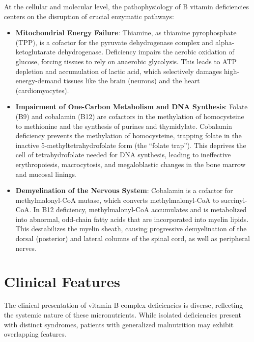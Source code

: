 At the cellular and molecular level, the pathophysiology of B vitamin deficiencies centers on the disruption of crucial enzymatic pathways:
\begin{itemize}
    \item \textbf{Mitochondrial Energy Failure}: Thiamine, as thiamine pyrophosphate (TPP), is a cofactor for the pyruvate dehydrogenase complex and alpha-ketoglutarate dehydrogenase. Deficiency impairs the aerobic oxidation of glucose, forcing tissues to rely on anaerobic glycolysis. This leads to ATP depletion and accumulation of lactic acid, which selectively damages high-energy-demand tissues like the brain (neurons) and the heart (cardiomyocytes).
    \item \textbf{Impairment of One-Carbon Metabolism and DNA Synthesis}: Folate (B9) and cobalamin (B12) are cofactors in the methylation of homocysteine to methionine and the synthesis of purines and thymidylate. Cobalamin deficiency prevents the methylation of homocysteine, trapping folate in the inactive 5-methyltetrahydrofolate form (the ``folate trap''). This deprives the cell of tetrahydrofolate needed for DNA synthesis, leading to ineffective erythropoiesis, macrocytosis, and megaloblastic changes in the bone marrow and mucosal linings.
    \item \textbf{Demyelination of the Nervous System}: Cobalamin is a cofactor for methylmalonyl-CoA mutase, which converts methylmalonyl-CoA to succinyl-CoA. In B12 deficiency, methylmalonyl-CoA accumulates and is metabolized into abnormal, odd-chain fatty acids that are incorporated into myelin lipids. This destabilizes the myelin sheath, causing progressive demyelination of the dorsal (posterior) and lateral columns of the spinal cord, as well as peripheral nerves.
\end{itemize}

\section*{Clinical Features}
The clinical presentation of vitamin B complex deficiencies is diverse, reflecting the systemic nature of these micronutrients. While isolated deficiencies present with distinct syndromes, patients with generalized malnutrition may exhibit overlapping features.

